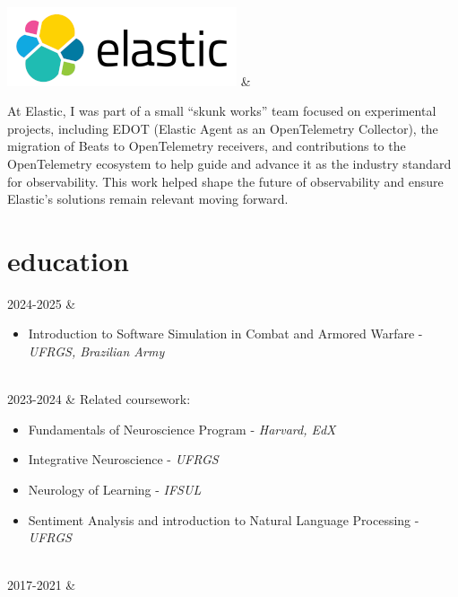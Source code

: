 \documentclass[]{cv-mauri}
\begin{document}
\begin{tabularcv}
	\\
	\includegraphics[scale=0.20]{images/elastic.png} &

	At Elastic, I was part of a small “skunk works” team focused on experimental projects, including
	EDOT (Elastic Agent as an OpenTelemetry Collector), the migration of Beats to OpenTelemetry receivers,
	and contributions to the OpenTelemetry ecosystem to help guide and advance it as the industry standard
	for observability. This work helped shape the future of observability and ensure Elastic's solutions
	remain relevant moving forward.

\end{tabularcv}

\section*{education}
\begin{tabularcv}
	2024-2025	&   
					\begin{itemize}
						\item Introduction to Software Simulation in Combat and Armored Warfare - \textit{UFRGS, Brazilian Army}
					\end{itemize}
					\\[\vspacepar]
	2023-2024   	&   
					\newline Related coursework:
					\begin{itemize}
						\item Fundamentals of Neuroscience Program - \textit{Harvard, EdX}
						\item Integrative Neuroscience - \textit{UFRGS}
						\item Neurology of Learning - \textit{IFSUL}
						\item Sentiment Analysis and introduction to Natural Language Processing - \textit{UFRGS}
					\end{itemize}
                    \\[\vspacepar] %
    2017-2021   &   
                    \\[\vspacepar] %
\end{tabularcv}
\end{document}
